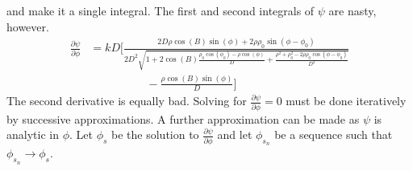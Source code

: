         and make it a single integral. The first and
        second integrals of $\psi$ are nasty, however.
        \begin{equation}
            \begin{split}
                \frac{\partial\psi}{\partial\phi}
                &=kD\Big[\frac{2D\rho\cos(B)
                    \sin(\phi)+2\rho\rho_{0}
                \sin(\phi-\phi_{0})}{2D^2\sqrt{1+2\cos(B)
                \frac{\rho_{0}\cos(\phi_{0})-\rho\cos(\phi)}{D}+
                \frac{\rho^{2}+\rho_{0}^{2}-
                2\rho\rho_{0}\cos(\phi-\phi_{0})}{D^2}}}\\
                &\quad\quad\quad\quad\quad
                -\frac{\rho\cos(B)\sin(\phi)}{D}\Big]
            \end{split}
        \end{equation}
        The second derivative is equally bad.
        Solving for $\frac{\partial\psi}{\partial\phi}=0$
        must be done iteratively by successive approximations.
        A further approximation can be made as $\psi$
        is analytic in $\phi$. Let $\phi_{s}$ be
        the solution to $\frac{\partial\psi}{\partial\phi}$
        and let $\phi_{s_{n}}$ be a sequence such that
        $\phi_{s_{n}}\rightarrow\phi_{s}$.
